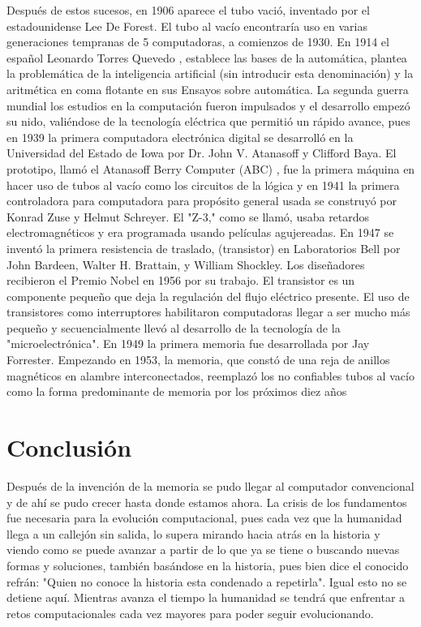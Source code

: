 \documentclass{article}
\begin{document}
Después de estos sucesos, en 1906 aparece el tubo vació, inventado por el estadounidense Lee De Forest. El tubo al vacío encontraría uso en varias generaciones tempranas de 5 computadoras, a comienzos de 1930. En 1914 el español Leonardo Torres Quevedo \citep{queved}, establece las bases de la automática, plantea la problemática de la inteligencia artificial (sin introducir esta denominación) y la aritmética en coma flotante en sus Ensayos sobre automática. 
La segunda guerra mundial los estudios en la computación fueron impulsados y el desarrollo empezó su nido, valiéndose de la tecnología eléctrica que permitió un rápido avance, pues en 1939 la primera computadora electrónica digital se desarrolló en la Universidad del Estado de Iowa por Dr. John V. Atanasoff y Clifford Baya. El prototipo, llamó el Atanasoff Berry Computer (ABC) \citep{abc}, fue la primera máquina en hacer uso de tubos al vacío como los circuitos de la lógica y en 1941 la primera controladora para computadora para propósito general usada se construyó por Konrad Zuse y Helmut Schreyer. El "Z-3," como se llamó, usaba retardos electromagnéticos y era programada usando películas agujereadas.
En 1947 se inventó la primera resistencia de traslado, (transistor) en Laboratorios Bell por John Bardeen, Walter H. Brattain, y William Shockley. Los diseñadores recibieron el Premio Nobel en 1956 por su trabajo. El transistor es un componente pequeño que deja la regulación del flujo eléctrico presente. El uso de transistores como interruptores habilitaron computadoras llegar a ser mucho más pequeño y secuencialmente llevó al desarrollo de la tecnología de la "microelectrónica".
En 1949 la primera memoria fue desarrollada por Jay Forrester.\citep{jay} Empezando en 1953, la memoria, que constó de una reja de anillos magnéticos en alambre interconectados, reemplazó los no confiables tubos al vacío como la forma predominante de memoria por los próximos diez años

\section{Conclusión}
Después de la invención de la memoria se pudo llegar al computador convencional y de ahí se pudo crecer hasta donde estamos ahora. La crisis de los fundamentos fue necesaria para la evolución computacional, pues cada vez que la humanidad llega a un callejón sin salida, lo supera mirando hacia atrás en la historia y viendo como se puede avanzar a partir de lo que ya se tiene o buscando nuevas formas y soluciones, también basándose en la historia, pues bien dice el conocido refrán: "Quien no conoce la historia esta condenado a repetirla".
Igual esto no se detiene aquí. Mientras avanza el tiempo la humanidad se tendrá que enfrentar a retos computacionales cada vez mayores para poder seguir evolucionando. 



\end{document}
